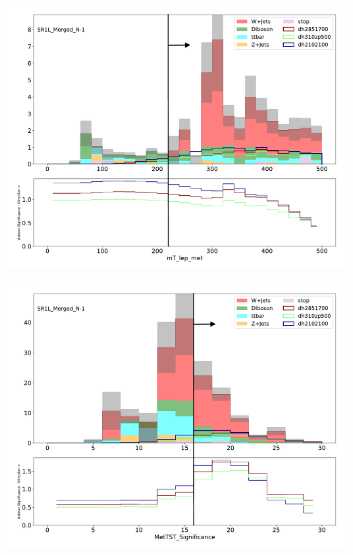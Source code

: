 \begin{figure}[htbp]
  \centering

     \begin{subfigure}{0.49\textwidth}
     \includegraphics[width = 0.98\textwidth]{Figures/4/N1m/mT_lep_met.pdf}
     \caption{\mtlepmet}
     \end{subfigure}
     \begin{subfigure}{0.49\textwidth}
     \includegraphics[width = 0.98\textwidth]{Figures/4/N1m/MetTST_Significance.pdf}
     \caption{\metsig}
     \end{subfigure}
     \begin{subfigure}{0.49\textwidth}

\end{subfigure}
\end{figure}
